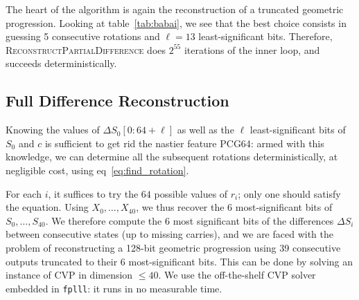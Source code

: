 \documentclass[submission,svgnames,journal=tosc]{iacrtrans}
\DeclareMathOperator{\LCG}{LCG}
\newcommand{\todo}[1]{\textcolor{red}{TODO:[#1]}}
\begin{document}
The heart of the algorithm is again the reconstruction of a truncated geometric
progression. Looking at table~\ref{tab:babai}, we see that the best choice
consists in guessing 5 consecutive rotations and $\ell=13$ least-significant
bits. Therefore, \textsc{ReconstructPartialDifference} does $2^{55}$ iterations
of the inner loop, and succeeds deterministically.




\subsection{Full Difference Reconstruction}

Knowing the values of $\Delta S_0[0:64+\ell]$ as well as the $\ell$
least-significant bits of $S_0$ and $c$ is sufficient to get rid the nastier
feature \textsf{PCG64}: armed with this knowledge, we can determine all the
subsequent rotations deterministically, at negligible cost, using
eq~\eqref{eq:find_rotation}.

For each $i$, it suffices to try the $64$ possible values of $r_i$; only one
should satisfy the equation. Using $X_0, \dots, X_{40}$, we thus recover the 6
most-significant bits of $S_0, \dots, S_{40}$. We therefore compute the 6 most
significant bits of the differences $\Delta S_i$ between consecutive states (up
to missing carries), and we are faced with the problem of reconstructing a
128-bit geometric progression using 39 consecutive outputs truncated to their 6
most-significant bits. This can be done by solving an instance of CVP in
dimension $\leq 40$. We use the off-the-shelf CVP solver embedded in
\texttt{fplll}: it runs in no measurable time.
\end{document}
